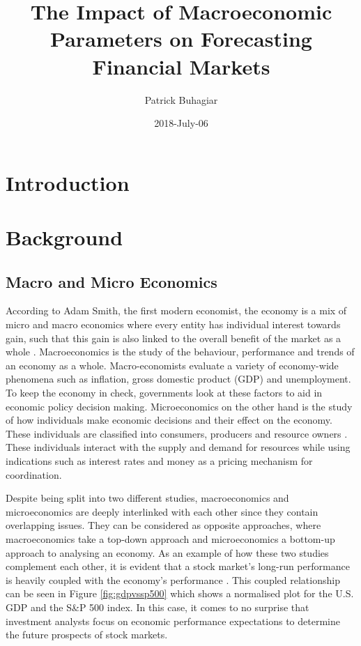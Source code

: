 \documentclass{UoYCSproject}
\author{Patrick Buhagiar}
\title{The Impact of Macroeconomic Parameters on Forecasting Financial Markets}
\date{2018-July-06}
\begin{document}
\maketitle

\listoffigures
\listoftables

\label{sec:start}
\thispagestyle{empty}\cleardoublepage

\chapter{Introduction}
\label{cha:literaturereview}

\chapter{Background}
\label{cha:background}

\section{Macro and Micro Economics}
According to Adam Smith, the first modern economist, the economy is a mix of micro and macro economics where every entity has individual interest towards gain, such that this gain is also linked to the overall benefit of the market as a whole \cite{smith1950inquiry}. Macroeconomics is the study of the behaviour, performance and trends of an economy as a whole. Macro-economists evaluate a variety of economy-wide phenomena such as inflation, gross domestic product (GDP) and unemployment. To keep the economy in check, governments look at these factors to aid in economic policy decision making. Microeconomics on the other hand is the study of how individuals make economic decisions and their effect on the economy. These individuals are classified into consumers, producers and resource owners \cite{dwivedi2002microeconomics}. These individuals interact with the supply and demand for resources while using indications such as interest rates and money as a pricing mechanism for coordination. 

Despite being split into two different studies, macroeconomics and microeconomics are deeply interlinked with each other since they contain overlapping issues. They can be considered as opposite approaches, where macroeconomics take a top-down approach and microeconomics a bottom-up approach to analysing an economy. As an example of how these two studies complement each other, it is evident that a stock market's long-run performance is heavily coupled with the economy's performance \cite{davis2008macroeconomic}. This coupled relationship can be seen in Figure \ref{fig:gdpvssp500} which shows a normalised plot for the U.S. GDP and the S\&P 500 index. In this case, it comes to no surprise that investment analysts focus on economic performance expectations to determine the future prospects of stock markets.
\end{document}
